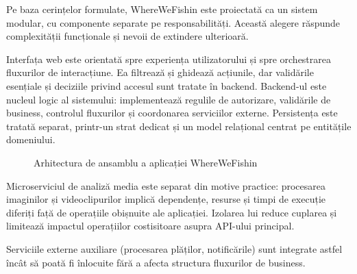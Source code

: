 Pe baza cerințelor formulate, WhereWeFishin este proiectată ca un sistem modular, cu componente separate pe responsabilități. Această alegere răspunde complexității funcționale și nevoii de extindere ulterioară.

Interfața web este orientată spre experiența utilizatorului și spre orchestrarea fluxurilor de interacțiune. Ea filtrează și ghidează acțiunile, dar validările esențiale și deciziile privind accesul sunt tratate în backend. Backend-ul este nucleul logic al sistemului: implementează regulile de autorizare, validările de business, controlul fluxurilor și coordonarea serviciilor externe. Persistența este tratată separat, printr-un strat dedicat și un model relațional centrat pe entitățile domeniului.

\begin{figure}[htbp]
\centering
{}
\caption{Arhitectura de ansamblu a aplicației WhereWeFishin}
\label{fig:arhitectura-wherewefishin}
\end{figure}

Microserviciul de analiză media este separat din motive practice: procesarea imaginilor și videoclipurilor implică dependențe, resurse și timpi de execuție diferiți față de operațiile obișnuite ale aplicației. Izolarea lui reduce cuplarea și limitează impactul operațiilor costisitoare asupra API-ului principal.

Serviciile externe auxiliare (procesarea plăților, notificările) sunt integrate astfel încât să poată fi înlocuite fără a afecta structura fluxurilor de business.

